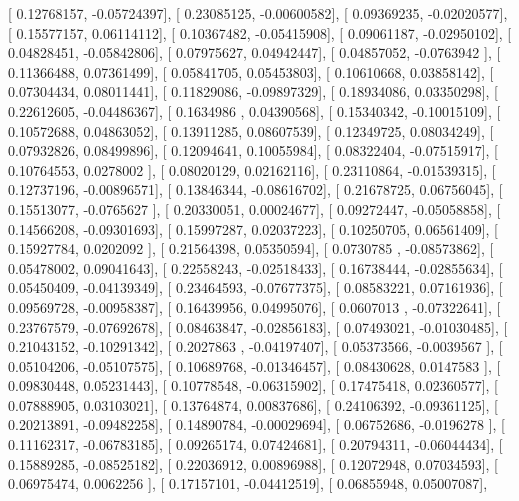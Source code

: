 \documentclass{article}
\begin{document}
       [ 0.12768157, -0.05724397],
       [ 0.23085125, -0.00600582],
       [ 0.09369235, -0.02020577],
       [ 0.15577157,  0.06114112],
       [ 0.10367482, -0.05415908],
       [ 0.09061187, -0.02950102],
       [ 0.04828451, -0.05842806],
       [ 0.07975627,  0.04942447],
       [ 0.04857052, -0.0763942 ],
       [ 0.11366488,  0.07361499],
       [ 0.05841705,  0.05453803],
       [ 0.10610668,  0.03858142],
       [ 0.07304434,  0.08011441],
       [ 0.11829086, -0.09897329],
       [ 0.18934086,  0.03350298],
       [ 0.22612605, -0.04486367],
       [ 0.1634986 ,  0.04390568],
       [ 0.15340342, -0.10015109],
       [ 0.10572688,  0.04863052],
       [ 0.13911285,  0.08607539],
       [ 0.12349725,  0.08034249],
       [ 0.07932826,  0.08499896],
       [ 0.12094641,  0.10055984],
       [ 0.08322404, -0.07515917],
       [ 0.10764553,  0.0278002 ],
       [ 0.08020129,  0.02162116],
       [ 0.23110864, -0.01539315],
       [ 0.12737196, -0.00896571],
       [ 0.13846344, -0.08616702],
       [ 0.21678725,  0.06756045],
       [ 0.15513077, -0.0765627 ],
       [ 0.20330051,  0.00024677],
       [ 0.09272447, -0.05058858],
       [ 0.14566208, -0.09301693],
       [ 0.15997287,  0.02037223],
       [ 0.10250705,  0.06561409],
       [ 0.15927784,  0.0202092 ],
       [ 0.21564398,  0.05350594],
       [ 0.0730785 , -0.08573862],
       [ 0.05478002,  0.09041643],
       [ 0.22558243, -0.02518433],
       [ 0.16738444, -0.02855634],
       [ 0.05450409, -0.04139349],
       [ 0.23464593, -0.07677375],
       [ 0.08583221,  0.07161936],
       [ 0.09569728, -0.00958387],
       [ 0.16439956,  0.04995076],
       [ 0.0607013 , -0.07322641],
       [ 0.23767579, -0.07692678],
       [ 0.08463847, -0.02856183],
       [ 0.07493021, -0.01030485],
       [ 0.21043152, -0.10291342],
       [ 0.2027863 , -0.04197407],
       [ 0.05373566, -0.0039567 ],
       [ 0.05104206, -0.05107575],
       [ 0.10689768, -0.01346457],
       [ 0.08430628,  0.0147583 ],
       [ 0.09830448,  0.05231443],
       [ 0.10778548, -0.06315902],
       [ 0.17475418,  0.02360577],
       [ 0.07888905,  0.03103021],
       [ 0.13764874,  0.00837686],
       [ 0.24106392, -0.09361125],
       [ 0.20213891, -0.09482258],
       [ 0.14890784, -0.00029694],
       [ 0.06752686, -0.0196278 ],
       [ 0.11162317, -0.06783185],
       [ 0.09265174,  0.07424681],
       [ 0.20794311, -0.06044434],
       [ 0.15889285, -0.08525182],
       [ 0.22036912,  0.00896988],
       [ 0.12072948,  0.07034593],
       [ 0.06975474,  0.0062256 ],
       [ 0.17157101, -0.04412519],
       [ 0.06855948,  0.05007087],
\end{document}
